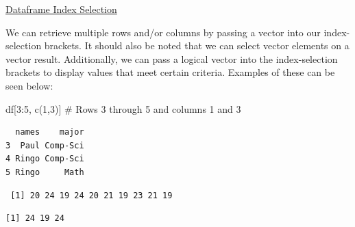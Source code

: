 \documentclass[
  letterpaper,
  DIV=11,
  numbers=noendperiod]{scrreprt}
\newenvironment{Shaded}{\begin{snugshade}}{\end{snugshade}}
\newcommand{\CommentTok}[1]{\textcolor[rgb]{0.37,0.37,0.37}{#1}}
\newcommand{\DecValTok}[1]{\textcolor[rgb]{0.68,0.00,0.00}{#1}}
\newcommand{\FunctionTok}[1]{\textcolor[rgb]{0.28,0.35,0.67}{#1}}
\newcommand{\NormalTok}[1]{\textcolor[rgb]{0.00,0.23,0.31}{#1}}
\newcommand{\SpecialCharTok}[1]{\textcolor[rgb]{0.37,0.37,0.37}{#1}}
\begin{document}
\begin{watch}{}{}
    \href{https://youtu.be/Sgaa-F_HEYo}{Dataframe Index Selection}
\end{watch}

We can retrieve multiple rows and/or columns by passing a vector into
our index-selection brackets. It should also be noted that we can select
vector elements on a vector result. Additionally, we can pass a logical
vector into the index-selection brackets to display values that meet
certain criteria. Examples of these can be seen below:

\begin{Shaded}
\begin{Highlighting}[]
\NormalTok{df[}\DecValTok{3}\SpecialCharTok{:}\DecValTok{5}\NormalTok{, }\FunctionTok{c}\NormalTok{(}\DecValTok{1}\NormalTok{,}\DecValTok{3}\NormalTok{)] }\CommentTok{\# Rows 3 through 5 and columns 1 and 3 }
\end{Highlighting}
\end{Shaded}

\begin{verbatim}
  names    major
3  Paul Comp-Sci
4 Ringo Comp-Sci
5 Ringo     Math
\end{verbatim}

\begin{Shaded}
\end{Shaded}

\begin{verbatim}
 [1] 20 24 19 24 20 21 19 23 21 19
\end{verbatim}

\begin{Shaded}
\end{Shaded}

\begin{verbatim}
[1] 24 19 24
\end{verbatim}

\begin{Shaded}
\end{Shaded}
\end{document}
